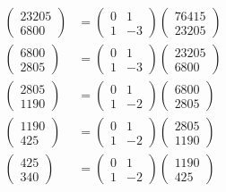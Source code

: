 \begin{align*}
\begin{pmatrix} 23205 \\ 6800 \end{pmatrix}
&=
\begin{pmatrix} 0&1\\1&-3 \end{pmatrix}
\begin{pmatrix} 76415 \\ 23205 \end{pmatrix}
\\
\begin{pmatrix} 6800 \\ 2805 \end{pmatrix}
&=
\begin{pmatrix} 0&1\\1&-3 \end{pmatrix}
\begin{pmatrix} 23205 \\ 6800 \end{pmatrix}
\\
\begin{pmatrix} 2805 \\ 1190 \end{pmatrix}
&=
\begin{pmatrix} 0&1\\1&-2 \end{pmatrix}
\begin{pmatrix} 6800 \\ 2805 \end{pmatrix}
\\
\begin{pmatrix} 1190 \\ 425 \end{pmatrix}
&=
\begin{pmatrix} 0&1\\1&-2 \end{pmatrix}
\begin{pmatrix} 2805 \\ 1190 \end{pmatrix}
\\
\begin{pmatrix} 425 \\ 340 \end{pmatrix}
&=
\begin{pmatrix} 0&1\\1&-2 \end{pmatrix}
\begin{pmatrix} 1190 \\ 425 \end{pmatrix}

\end{align*}
